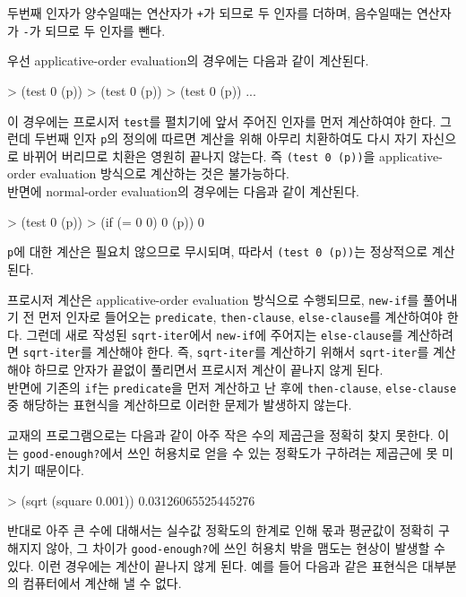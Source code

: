 두번째 인자가 양수일때는 연산자가 \texttt{+}가 되므로 두 인자를 더하며,
음수일때는 연산자가 \texttt{-}가 되므로 두 인자를 뺀다.

우선 applicative-order evaluation의 경우에는 다음과 같이 계산된다.
\begin{lisp}
> (test 0 (p))
> (test 0 (p))
> (test 0 (p))
  ...
\end{lisp}
이 경우에는 프로시저 \texttt{test}를 펼치기에 앞서 주어진 인자를 먼저 계산하여야
한다. 그런데 두번째 인자 \texttt{p}의 정의에 따르면 계산을 위해 아무리
치환하여도 다시 자기 자신으로 바뀌어 버리므로 치환은 영원히 끝나지 않는다. 즉
\texttt{(test 0 (p))}을 applicative-order evaluation 방식으로 계산하는 것은
불가능하다.\\

반면에 normal-order evaluation의 경우에는 다음과 같이 계산된다.
\begin{lisp}
> (test 0 (p))
> (if (= 0 0)
      0
      (p))
0
\end{lisp}
\texttt{p}에 대한 계산은 필요치 않으므로 무시되며, 따라서 \texttt{(test 0
  (p))}는 정상적으로 계산된다.


 프로시저 계산은 applicative-order evaluation 방식으로 수행되므로,
\texttt{new-if}를 풀어내기 전 먼저 인자로 들어오는 \texttt{predicate},
\texttt{then-clause}, \texttt{else-clause}를 계산하여야 한다. 그런데 새로
작성된 \texttt{sqrt-iter}에서 \texttt{new-if}에 주어지는
\texttt{else-clause}를 계산하려면 \texttt{sqrt-iter}를 계산해야 한다. 즉,
\texttt{sqrt-iter}를 계산하기 위해서 \texttt{sqrt-iter}를 계산해야 하므로
안자가 끝없이 풀리면서 프로시저 계산이 끝나지 않게 된다.\\

반면에 기존의 \texttt{if}는 \texttt{predicate}을 먼저 계산하고 난 후에
\texttt{then-clause}, \texttt{else-clause} 중 해당하는 표현식을 계산하므로
이러한 문제가 발생하지 않는다.


교재의 프로그램으로는 다음과 같이 아주 작은 수의 제곱근을 정확히 찾지
못한다. 이는 \texttt{good-enough?}에서 쓰인 허용치로 얻을 수 있는 정확도가
구하려는 제곱근에 못 미치기 때문이다.

\begin{lisp}
> (sqrt (square 0.001))
0.03126065525445276
\end{lisp}

반대로 아주 큰 수에 대해서는 실수값 정확도의 한계로 인해 몫과 평균값이 정확히
구해지지 않아, 그 차이가 \texttt{good-enough?}에 쓰인 허용치 밖을 맴도는
현상이 발생할 수 있다. 이런 경우에는 계산이 끝나지 않게 된다. 예를 들어 다음과
같은 표현식은 대부분의 컴퓨터에서 계산해 낼 수 없다.

